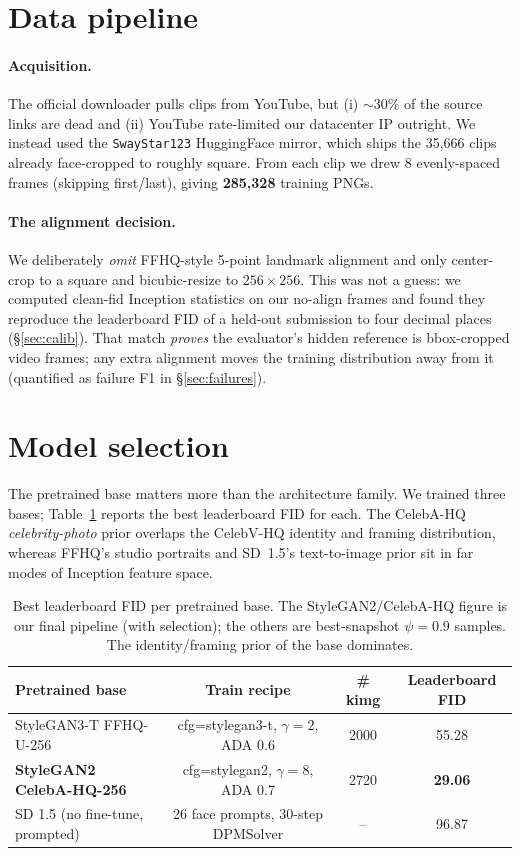 \documentclass{article}
\begin{document}
\section{Data pipeline}
\label{sec:data}
\paragraph{Acquisition.} The official \citet{zhu2022celebv} downloader pulls
clips from YouTube, but (i) ${\sim}30\%$ of the source links are dead and
(ii) YouTube rate-limited our datacenter IP outright. We instead used the
\texttt{SwayStar123} HuggingFace mirror, which ships the 35,666 clips already
face-cropped to roughly square. From each clip we drew 8 evenly-spaced frames
(skipping first/last), giving \textbf{285,328} training PNGs.

\paragraph{The alignment decision.} We deliberately \emph{omit} FFHQ-style
5-point landmark alignment and only center-crop to a square and bicubic-resize
to $256\!\times\!256$. This was not a guess: we computed clean-fid
\citep{parmar2022aliased} Inception statistics on our no-align frames and found
they reproduce the leaderboard FID of a held-out submission to four decimal
places (\S\ref{sec:calib}). That match \emph{proves} the evaluator's hidden
reference is bbox-cropped video frames; any extra alignment moves the training
distribution away from it (quantified as failure F1 in \S\ref{sec:failures}).

\section{Model selection}
\label{sec:model}
The pretrained base matters more than the architecture family. We trained three
bases; Table~\ref{tab:pretrained} reports the best leaderboard FID for each.
The CelebA-HQ \emph{celebrity-photo} prior overlaps the CelebV-HQ identity and
framing distribution, whereas FFHQ's studio portraits and SD~1.5's text-to-image
prior sit in far modes of Inception feature space.

\begin{table}[h]\centering\small
\begin{tabular}{l c c c}
\toprule
Pretrained base & Train recipe & \# kimg & Leaderboard FID \\
\midrule
StyleGAN3-T FFHQ-U-256 & cfg=stylegan3-t, $\gamma{=}2$, ADA 0.6 & 2000 & 55.28 \\
\textbf{StyleGAN2 CelebA-HQ-256} & cfg=stylegan2, $\gamma{=}8$, ADA 0.7  & 2720 & \textbf{29.06} \\
SD 1.5 (no fine-tune, prompted) & 26 face prompts, 30-step DPMSolver & --   & 96.87 \\
\bottomrule
\end{tabular}
\caption{Best leaderboard FID per pretrained base. The StyleGAN2/CelebA-HQ
figure is our final pipeline (with selection); the others are best-snapshot
$\psi{=}0.9$ samples. The identity/framing prior of the base dominates.}
\label{tab:pretrained}
\end{table}
\end{document}
